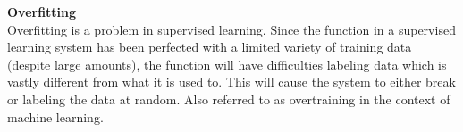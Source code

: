 \textbf{Overfitting} \\
Overfitting is a problem in supervised learning. Since the function in a supervised learning system has been perfected with a limited variety of training data (despite large amounts), the function will have difficulties labeling data which is vastly different from what it is used to. This will cause the system to either break or labeling the data at random. Also referred to as overtraining in the context of machine learning. 




